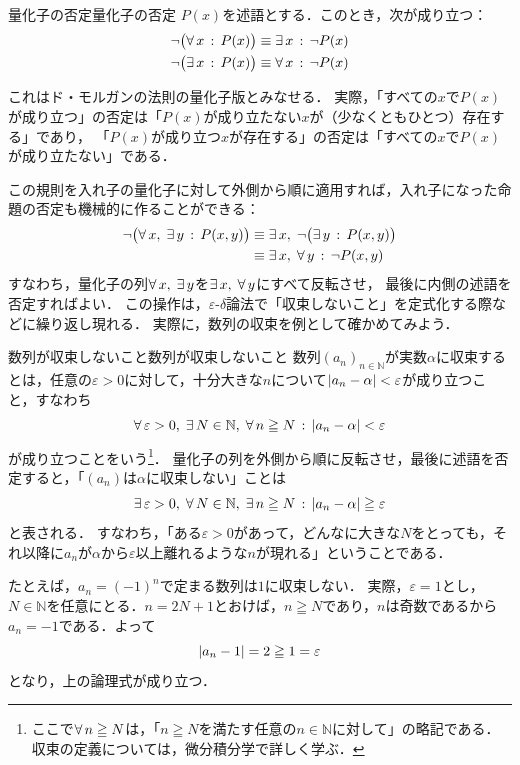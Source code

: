 \begin{prop}{量化子の否定}{量化子の否定}
  $P(x)$を述語とする．このとき，次が成り立つ：
  \begin{align*}
    \lnot \bigl( \forall\, x \,:\, P(x) \bigr) & \equiv \exists\, x \,:\, \lnot P(x) \\
    \lnot \bigl( \exists\, x \,:\, P(x) \bigr) & \equiv \forall\, x \,:\, \lnot P(x)
  \end{align*}
\end{prop}
 
これはド・モルガンの法則の量化子版とみなせる．
実際，「すべての$x$で$P(x)$が成り立つ」の否定は「$P(x)$が成り立たない$x$が（少なくともひとつ）存在する」であり，
「$P(x)$が成り立つ$x$が存在する」の否定は「すべての$x$で$P(x)$が成り立たない」である．
 
この規則を入れ子の量化子に対して外側から順に適用すれば，入れ子になった命題の否定も機械的に作ることができる：
\begin{align*}
  \lnot \bigl( \forall\, x ,\; \exists\, y \,:\, P(x, y) \bigr)
  & \equiv \exists\, x ,\; \lnot \bigl( \exists\, y \,:\, P(x, y) \bigr) \\
  & \equiv \exists\, x ,\; \forall\, y \,:\, \lnot P(x, y)
\end{align*}
すなわち，量化子の列$\forall\, x ,\; \exists\, y$を$\exists\, x ,\; \forall\, y$にすべて反転させ，
最後に内側の述語を否定すればよい．
この操作は，$\varepsilon$-$\delta$論法で「収束しないこと」を定式化する際などに繰り返し現れる．
実際に，数列の収束を例として確かめてみよう．

\begin{example}{数列が収束しないこと}{数列が収束しないこと}
  数列$(a_n)_{n \in \mathbb{N}}$が実数$\alpha$に収束するとは，任意の$\varepsilon > 0$に対して，十分大きな$n$について$\lvert a_n - \alpha\rvert < \varepsilon$が成り立つこと，すなわち
  \[
    \forall\, \varepsilon > 0 ,\; \exists\, N \in \mathbb{N} ,\; \forall\, n \geqq N \,:\, \lvert a_n - \alpha\rvert < \varepsilon
  \]
  が成り立つことをいう\footnote{ここで$\forall\, n \geqq N$は，「$n \geqq N$を満たす任意の$n \in \mathbb{N}$に対して」の略記である．収束の定義については，微分積分学で詳しく学ぶ．}．
  量化子の列を外側から順に反転させ，最後に述語を否定すると，「$(a_n)$は$\alpha$に収束しない」ことは
  \[
    \exists\, \varepsilon > 0 ,\; \forall\, N \in \mathbb{N} ,\; \exists\, n \geqq N \,:\, \lvert a_n - \alpha\rvert \geqq \varepsilon
  \]
  と表される．
  すなわち，「ある$\varepsilon > 0$があって，どんなに大きな$N$をとっても，それ以降に$a_n$が$\alpha$から$\varepsilon$以上離れるような$n$が現れる」ということである．

  たとえば，$a_n = (-1)^n$で定まる数列は$1$に収束しない．
  実際，$\varepsilon = 1$とし，$N \in \mathbb{N}$を任意にとる．$n = 2N + 1$とおけば，$n \geqq N$であり，$n$は奇数であるから$a_n = -1$である．よって
  \[
    \lvert a_n - 1\rvert = 2 \geqq 1 = \varepsilon
  \]
  となり，上の論理式が成り立つ．
\end{example}

